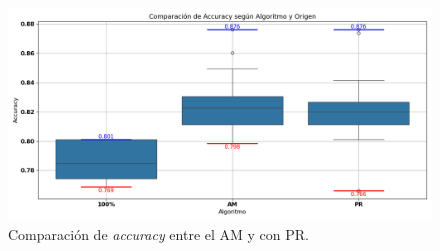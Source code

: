 \begin{figure}[htp]
    \centering
    \includegraphics[width=1\textwidth]{imagenes/evaluaciones/reinicio-poblacional}
    \caption{Comparación de \textit{accuracy} entre el AM y con PR.}
    \label{fig:reinicio_poblacional}
\end{figure}
